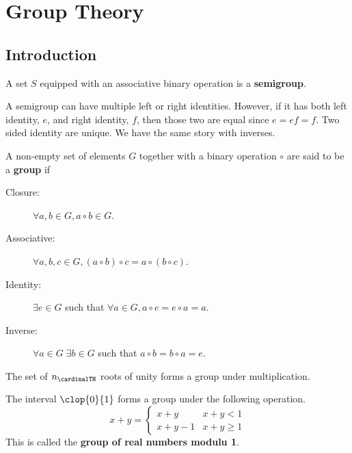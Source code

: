 \chapter{Group Theory}
\section{Introduction}
\begin{definition}
    A set \(S\) equipped with an associative binary operation is a \textbf{semigroup}.
\end{definition}
A semigroup can have multiple left or right identities. However, if it has both left identity, \(e\), and right identity, \(f\), then those two are equal since \(e = ef = f\). Two sided identity are unique. We have the same story with inverses.

\begin{definition}
    A non-empty set of elements \(G\) together with a binary operation \(\circ\) are said to be a \textbf{group} if 
    \begin{description}
        \item[Closure:] \(\forall a,b \in G, a \circ b \in G\).
        \item[Associative:] \(\forall a,b,c \in G, (a \circ b ) \circ c = a \circ (b \circ c)\).
        \item[Identity:] \(\exists e \in G\) such that \(\forall a\in G, a \circ e = e \circ a = a\).  
        \item[Inverse:] \(\forall a \in G \; \exists b \in G\) such that \(a \circ b = b \circ a = e\).  
    \end{description}
\end{definition}

\begin{example}
    The set of \(n_{\cardinalTH}\) roots of unity forms a group under multiplication.
\end{example}
\begin{example}
    The interval \(\clop{0}{1}\) forms a group under the following operation.
    \begin{equation*}
        x + y = \begin{cases}
            x + y & x + y < 1\\
            x + y - 1 & x + y \geq 1
        \end{cases}
    \end{equation*}
    This is called the \textbf{group of real numbers modulu 1}.
\end{example}

